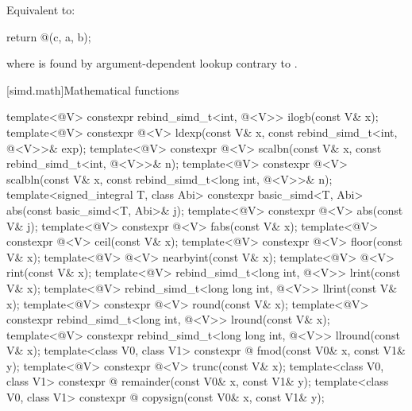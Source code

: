 \begin{itemdescr}
  \pnum\effects
  Equivalent to:
  \begin{codeblock}
return @\simdselect@(c, a, b);
  \end{codeblock}
  where \tcode{\simdselect} is found by argument-dependent lookup 
  contrary to .
\end{itemdescr}

[simd.math]{Mathematical functions}

\begin{itemdecl}
template<@\mathfloatingpoint@ V> constexpr rebind_simd_t<int, @\deducedsimd@<V>> ilogb(const V& x);
template<@\mathfloatingpoint@ V> constexpr @\deducedsimd@<V> ldexp(const V& x, const
rebind_simd_t<int, @\deducedsimd@<V>>& exp);
template<@\mathfloatingpoint@ V> constexpr @\deducedsimd@<V> scalbn(const V& x, const
rebind_simd_t<int, @\deducedsimd@<V>>& n);
template<@\mathfloatingpoint@ V>
  constexpr @\deducedsimd@<V> scalbln(const V& x, const rebind_simd_t<long int, @\deducedsimd@<V>>& n);
template<signed_integral T, class Abi>
  constexpr basic_simd<T, Abi> abs(const basic_simd<T, Abi>& j);
template<@\mathfloatingpoint@ V> constexpr @\deducedsimd@<V> abs(const V& j);
template<@\mathfloatingpoint@ V> constexpr @\deducedsimd@<V> fabs(const V& x);
template<@\mathfloatingpoint@ V> constexpr @\deducedsimd@<V> ceil(const V& x);
template<@\mathfloatingpoint@ V> constexpr @\deducedsimd@<V> floor(const V& x);
template<@\mathfloatingpoint@ V> @\deducedsimd@<V> nearbyint(const V& x);
template<@\mathfloatingpoint@ V> @\deducedsimd@<V> rint(const V& x);
template<@\mathfloatingpoint@ V> rebind_simd_t<long int, @\deducedsimd@<V>> lrint(const V& x);
template<@\mathfloatingpoint@ V> rebind_simd_t<long long int, @\deducedsimd@<V>> llrint(const V& x);
template<@\mathfloatingpoint@ V> constexpr @\deducedsimd@<V> round(const V& x);
template<@\mathfloatingpoint@ V> constexpr rebind_simd_t<long int, @\deducedsimd@<V>> lround(const V& x);
template<@\mathfloatingpoint@ V> constexpr rebind_simd_t<long long int, @\deducedsimd@<V>> llround(const V& x);
template<class V0, class V1>
  constexpr @ fmod(const V0& x, const V1& y);
template<@\mathfloatingpoint@ V> constexpr @\deducedsimd@<V> trunc(const V& x);
template<class V0, class V1>
  constexpr @ remainder(const V0& x, const V1& y);
template<class V0, class V1>
  constexpr @ copysign(const V0& x, const V1& y);

\end{itemdecl}

